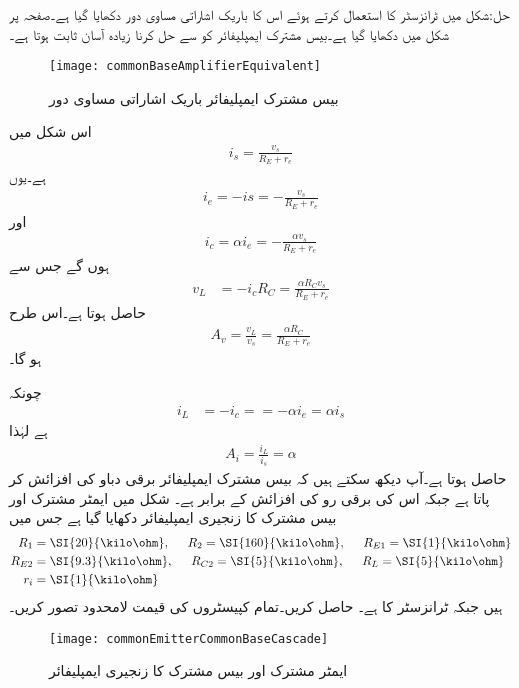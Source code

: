 حل:شکل  میں ٹرانزسٹر کا  استعمال کرتے ہوئے اس کا باریک اشاراتی مساوی دور دکھایا گیا ہے۔صفحہ  پر شکل  میں   دکھایا گیا ہے۔بیس مشترک ایمپلیفائر کو  سے حل کرنا زیادہ آسان ثابت ہوتا ہے۔
\begin{figure}
\centering
\texttt{[image: commonBaseAmplifierEquivalent]}
\caption{بیس مشترک ایمپلیفائر باریک اشاراتی مساوی دور}
\label{شکل_ٹرانزسٹر_قابو_مشترک_ایمپلیفائر_باریک_اشاراتی_مساوی}
\end{figure}
اس شکل میں
\begin{align*}
i_s=\frac{v_s}{R_E+r_e}
\end{align*}
ہے۔یوں
\begin{align*}
i_e=-is = -\frac{v_s}{R_E+r_e}
\end{align*}
اور 
\begin{align*}
i_c=\alpha i_e=-\frac{\alpha v_s}{R_E+r_e}
\end{align*}
ہوں گے جس سے
\begin{align*}
v_L&=-i_c R_C=\frac{\alpha R_C v_s}{R_E+r_e}
\end{align*}
حاصل ہوتا ہے۔اس طرح
\begin{align*}
A_v=\frac{v_L}{v_s}=\frac{\alpha R_C}{R_E+r_e}
\end{align*}
ہو گا۔

چونکہ
\begin{align*}
i_L&=-i_c==-\alpha i_e=\alpha i_s
\end{align*}
ہے لہٰذا
\begin{align*}
A_i=\frac{i_L}{i_s}=\alpha
\end{align*}
حاصل ہوتا ہے۔آپ دیکھ سکتے ہیں کہ بیس مشترک ایمپلیفائر برقی دباو کی افزائش کر پاتا ہے جبکہ اس کی برقی رو کی افزائش  کے برابر ہے۔
شکل  میں ایمٹر مشترک اور بیس مشترک کا زنجیری ایمپلیفائر دکھایا گیا ہے جس میں
\begin{align*}
R_1&=\SI{20}{\kilo \ohm}, \hspace{5mm} R_2=\SI{160}{\kilo \ohm}, \hspace{5mm} R_{E1}=\SI{1}{\kilo \ohm}\\
R_{E2}&=\SI{9.3}{\kilo \ohm}, \hspace{5mm} R_{C2}=\SI{5}{\kilo \ohm}, \hspace{5mm} R_L=\SI{5}{\kilo \ohm}\\
r_i&=\SI{1}{\kilo \ohm}
\end{align*}
ہیں جبکہ ٹرانزسٹر کا  ہے۔ حاصل کریں۔تمام کپیسٹروں کی قیمت لامحدود تصور کریں۔
\begin{figure}
\centering
\texttt{[image: commonEmitterCommonBaseCascade]}
\caption{ایمٹر مشترک اور بیس مشترک کا زنجیری ایمپلیفائر}
\label{شکل_ٹرانزسٹر_مخارج_مشترک_قابو_مشترک_زنجیر}
\end{figure}

